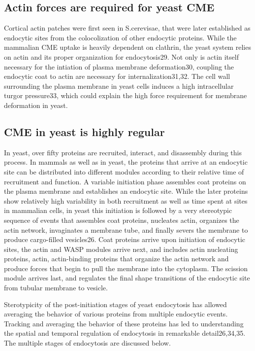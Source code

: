 		\subsection{Actin forces are required for yeast CME}
		Cortical actin patches were first seen in S.cerevisae, that were later established as endocytic sites from the colocolization of other endocytic proteins. While the mammalian CME uptake is heavily dependent on clathrin, the yeast system relies on actin and its proper organization for endocytosis29. Not only is actin itself necessary for the intiation of plasma membrane deformation30, coupling the endocytic coat to actin are necessary for internalization31,32.  The cell wall surrounding the plasma membrane in yeast cells induces a high intracellular turgor pressure33, which could explain the high force requirement for membrane deformation in yeast. 


	
		\subsection{CME in yeast is highly regular}
		In yeast, over fifty proteins are recruited, interact, and disassembly during this process. In mammals as well as in yeast, the proteins that arrive at an endocytic site can be distributed into different modules according to their relative time of recruitment and function. A variable initiation phase assembles coat proteins on the plasma membrane and establishes an endocytic site. While the later proteins show relatively high variability in both recruitment as well as time spent at sites in mammalian cells, in yeast this initiation is followed by a very stereotypic sequence of events that assembles coat proteins, nucleates actin, organizes the actin network, invaginates a membrane tube, and finally severs the membrane to produce cargo-filled vesicles26. Coat proteins arrive upon initiation of endocytic sites, the actin and WASP modules arrive next, and includes actin nucleating proteins, actin, actin-binding proteins that organize the actin network and produce forces that begin to pull the membrane into the cytoplasm. The scission module arrives last, and regulates the final shape transitions of the endocytic site from tubular membrane to vesicle. 

		\vspace{5mm}
		Sterotypicity of the post-initiation stages of yeast endocytosis has allowed averaging the behavior of various proteins from multiple endocytic events. Tracking and averaging the behavior of these proteins has led to understanding the spatial and temporal regulation of endocytosis in remarkable detail26,34,35. The multiple stages of endocytosis are discussed below. 
 


